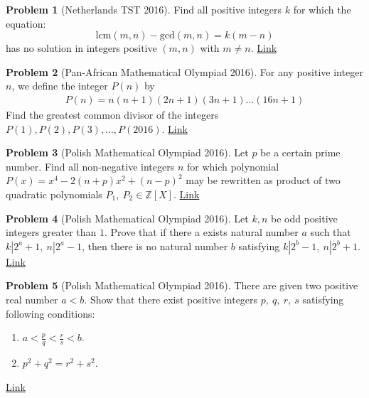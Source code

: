\documentclass[]{article}
\theoremstyle{definition}
\newtheorem{problem}{Problem}
\begin{document}
\begin{problem}[Netherlands TST 2016]
	Find all positive integers $k$ for which the equation: $$ \text{lcm}(m,n)-\text{gcd}(m,n)=k(m-n)$$has no solution in integers positive $(m,n)$ with $m\neq n$. \hfill \href{http://artofproblemsolving.com/community/c6h1309257p7009221}{Link}
\end{problem}



\begin{problem}[Pan-African Mathematical Olympiad 2016]
	For any positive integer $n$, we define the integer $P(n)$ by
		\begin{align*}
				P(n)=n(n+1)(2n+1)(3n+1)\dots(16n+1)
		\end{align*}
	Find the greatest common divisor of the integers $P(1), P(2), P(3),\dots,P(2016)$. \hfill \href{http://artofproblemsolving.com/community/c6h1235286p6271340}{Link}
\end{problem}



\begin{problem}[Polish Mathematical Olympiad 2016]
	Let $p$ be a certain prime number. Find all non-negative integers $n$ for which polynomial $P(x)=x^4-2(n+p)x^2+(n-p)^2$ may be rewritten as product of two quadratic polynomials $P_1, \ P_2 \in \mathbb{Z}[X]$. \hfill \href{http://artofproblemsolving.com/community/c6h1224662p6149472}{Link}
\end{problem}




\begin{problem}[Polish Mathematical Olympiad 2016]
	Let $k, n$ be odd positive integers greater than $1$. Prove that if there a exists natural number $a$ such that $k|2^a+1, \ n|2^a-1$, then there is no natural number $b$ satisfying $k|2^b-1, \ n|2^b+1$. \hfill \href{http://artofproblemsolving.com/community/c6h1224675p6149643}{Link}
\end{problem}



\begin{problem}[Polish Mathematical Olympiad 2016]
	There are given two positive real number $a<b$. Show that there exist positive integers $p, \ q, \ r, \ s$ satisfying following conditions:
		\begin{enumerate}
			\item $a< \frac{p}{q} < \frac{r}{s} < b$.
			\item $p^2+q^2=r^2+s^2$.
		\end{enumerate}
	\flushright \href{http://artofproblemsolving.com/community/c6h1224679p6149678}{Link}
\end{problem}
\end{document}
